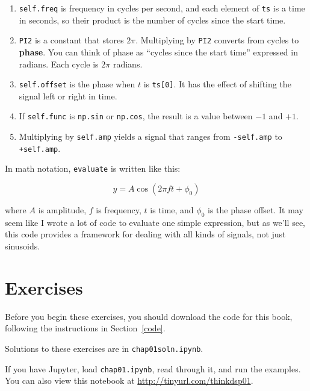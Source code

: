 \documentclass[12pt]{book} \usepackage[width=5.5in,height=8.5in, hmarginratio=3:2,vmarginratio=1:1]{geometry}
\begin{document}
\begin{enumerate} 

\item {\tt self.freq} is frequency in cycles per second, and each element of {\tt ts} is a time in seconds, so their product is the number of cycles since the start time. 

\item {\tt PI2} is a constant that stores $2 \pi$. Multiplying by {\tt PI2} converts from cycles to {\bf phase}. You can think of phase as ``cycles since the start time'' expressed in radians. Each cycle is $2 \pi$ radians. 

\item {\tt self.offset} is the phase when $t$ is {\tt ts[0]}. It has the effect of shifting the signal left or right in time. 

\item If {\tt self.func} is {\tt np.sin} or {\tt np.cos}, the result is a value between $-1$ and $+1$. 

\item Multiplying by {\tt self.amp} yields a signal that ranges from {\tt -self.amp} to {\tt +self.amp}. 

\end{enumerate} 

In math notation, {\tt evaluate} is written like this: 

%
\[ y = A \cos (2 \pi f t + \phi_0) \] 

%
where $A$ is amplitude, $f$ is frequency, $t$ is time, and $\phi_0$ is the phase offset. It may seem like I wrote a lot of code to evaluate one simple expression, but as we'll see, this code provides a framework for dealing with all kinds of signals, not just sinusoids. 

\section{Exercises} 

Before you begin these exercises, you should download the code for this book, following the instructions in Section~\ref{code}. 

Solutions to these exercises are in {\tt chap01soln.ipynb}. 

\begin{exercise} If you have Jupyter, load {\tt chap01.ipynb}, read through it, and run the examples. You can also view this notebook at \url{http://tinyurl.com/thinkdsp01}. \end{exercise} 
\end{document}
